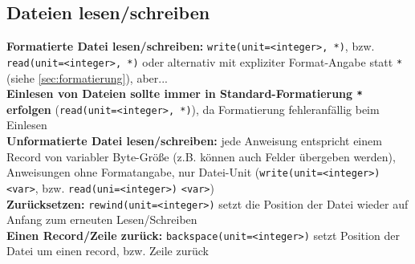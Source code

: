 \documentclass[a4paper, twocolumn]{scrarticle}
\begin{document}
\subsection{Dateien lesen/schreiben}
\textbf{Formatierte Datei lesen/schreiben:} \lstinline|write(unit=<integer>, *)|, bzw. \lstinline|read(unit=<integer>, *)| oder alternativ mit expliziter Format-Angabe statt \lstinline|*| (siehe \cref{sec:formatierung}), aber...\\
\textbf{Einlesen von Dateien sollte immer in Standard-Formatierung \lstinline|*| erfolgen} (\lstinline|read(unit=<integer>, *)|), da Formatierung fehleranfällig beim Einlesen\\
\textbf{Unformatierte Datei lesen/schreiben:} jede Anweisung entspricht einem Record von variabler Byte-Größe (z.B. können auch Felder übergeben werden), Anweisungen ohne Formatangabe, nur Datei-Unit (\lstinline|write(unit=<integer>)| \lstinline|<var>|, bzw. \lstinline|read(uni=<integer>)| \lstinline|<var>|)\\
\textbf{Zurücksetzen:} \lstinline|rewind(unit=<integer>)| setzt die Position der Datei wieder auf Anfang zum erneuten Lesen/Schreiben\\
\textbf{Einen Record/Zeile zurück:} \lstinline|backspace(unit=<integer>)| setzt Position der Datei um einen record, bzw. Zeile zurück
\end{document}
